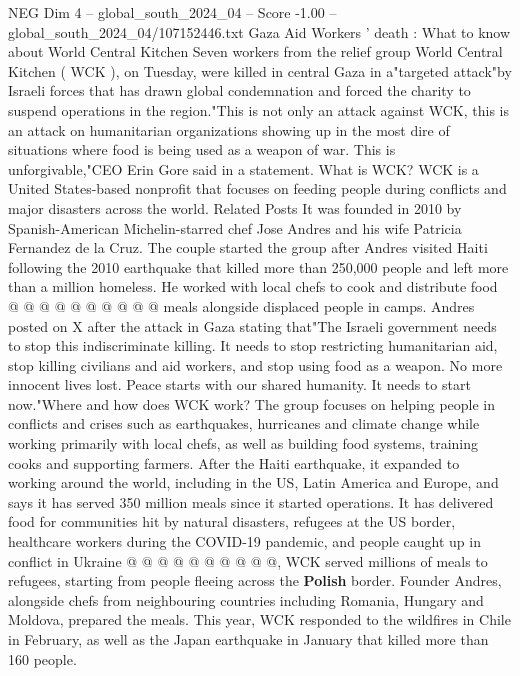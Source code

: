 \begin{textsample}{NEG Dim 4 – global\_south\_2024\_04 – Score -1.00 – global\_south\_2024\_04/107152446.txt}  \label{ex:f4_neg_193}
Gaza Aid Workers ' death : What to know about World Central Kitchen Seven workers from the relief group World Central Kitchen ( WCK ), on Tuesday, were killed in central Gaza in a"targeted attack"by Israeli forces that has drawn global condemnation and forced the charity to suspend operations in the region."This is not only an attack against WCK, this is an attack on humanitarian organizations showing up in the most dire of situations where food is being used as a weapon of war.
This is unforgivable,"CEO Erin Gore said in a statement.
What is WCK?
WCK is a United States-based nonprofit that focuses on feeding people during conflicts and major disasters across the world.
Related Posts It was founded in 2010 by Spanish-American Michelin-starred chef Jose Andres and his wife Patricia Fernandez de la Cruz.
The couple started the group after Andres visited Haiti following the 2010 earthquake that killed more than 250,000 people and left more than a million homeless.
He worked with local chefs to cook and distribute food @ @ @ @ @ @ @ @ @ @ meals alongside displaced people in camps.
Andres posted on X after the attack in Gaza stating that"The Israeli government needs to stop this indiscriminate killing.
It needs to stop restricting humanitarian aid, stop killing civilians and aid workers, and stop using food as a weapon.
No more innocent lives lost.
Peace starts with our shared humanity.
It needs to start now."Where and how does WCK work?
The group focuses on helping people in conflicts and crises such as earthquakes, hurricanes and climate change while working primarily with local chefs, as well as building food systems, training cooks and supporting farmers.
After the Haiti earthquake, it expanded to working around the world, including in the US, Latin America and Europe, and says it has served 350 million meals since it started operations.
It has delivered food for communities hit by natural disasters, refugees at the US border, healthcare workers during the COVID-19 pandemic, and people caught up in conflict in Ukraine @ @ @ @ @ @ @ @ @ @, WCK served millions of meals to refugees, starting from people fleeing across the \textbf{Polish} border.
Founder Andres, alongside chefs from neighbouring countries including Romania, Hungary and Moldova, prepared the meals.
This year, WCK responded to the wildfires in Chile in February, as well as the Japan earthquake in January that killed more than 160 people.

\end{textsample}
